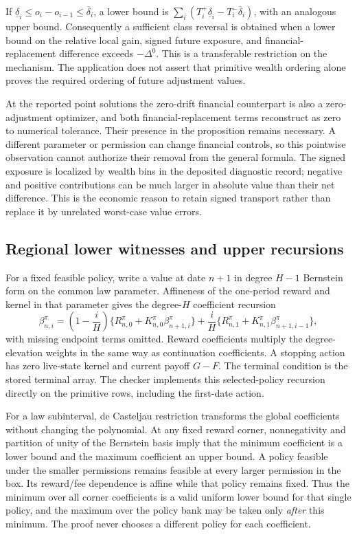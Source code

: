 If $\underline\delta_i\leq o_i-o_{i-1}\leq\overline\delta_i$, a lower bound is
$\sum_i(T_i^+\underline\delta_i-T_i^-\overline\delta_i)$, with an analogous upper bound. Consequently a sufficient class reversal is obtained when a lower bound on the relative local gain, signed future exposure, and financial-replacement difference exceeds $-\Delta^0$. This is a transferable restriction on the mechanism. The application does not assert that primitive wealth ordering alone proves the required ordering of future adjustment values.

At the reported point solutions the zero-drift financial counterpart is also a zero-adjustment optimizer, and both financial-replacement terms reconstruct as zero to numerical tolerance. Their presence in the proposition remains necessary. A different parameter or permission can change financial controls, so this pointwise observation cannot authorize their removal from the general formula. The signed exposure is localized by wealth bins in the deposited diagnostic record; negative and positive contributions can be much larger in absolute value than their net difference. This is the economic reason to retain signed transport rather than replace it by unrelated worst-case value errors.

\subsection{Regional lower witnesses and upper recursions}
For a fixed feasible policy, write a value at date $n+1$ in degree $H-1$ Bernstein form on the common law parameter. Affineness of the one-period reward and kernel in that parameter gives the degree-$H$ coefficient recursion
\begin{equation}
 \beta_{n,i}^\pi=
 \left(1-\frac iH\right)\{R_{n,0}^\pi+K_{n,0}^\pi\beta_{n+1,i}^\pi\}
 +\frac iH\{R_{n,1}^\pi+K_{n,1}^\pi\beta_{n+1,i-1}^\pi\},
\end{equation}
with missing endpoint terms omitted. Reward coefficients multiply the degree-elevation weights in the same way as continuation coefficients. A stopping action has zero live-state kernel and current payoff $G-F$. The terminal condition is the stored terminal array. The checker implements this selected-policy recursion directly on the primitive rows, including the first-date action.

For a law subinterval, de Casteljau restriction transforms the global coefficients without changing the polynomial. At any fixed reward corner, nonnegativity and partition of unity of the Bernstein basis imply that the minimum coefficient is a lower bound and the maximum coefficient an upper bound. A policy feasible under the smaller permissions remains feasible at every larger permission in the box. Its reward/fee dependence is affine while that policy remains fixed. Thus the minimum over all corner coefficients is a valid uniform lower bound for that single policy, and the maximum over the policy bank may be taken only \emph{after} this minimum. The proof never chooses a different policy for each coefficient.

